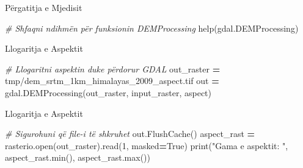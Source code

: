\documentclass[
  ignorenonframetext,
]{beamer}
\newenvironment{Shaded}{\begin{snugshade}}{\end{snugshade}}
\newcommand{\BuiltInTok}[1]{#1}
\newcommand{\CommentTok}[1]{\textcolor[rgb]{0.56,0.35,0.01}{\textit{#1}}}
\newcommand{\DecValTok}[1]{\textcolor[rgb]{0.00,0.00,0.81}{#1}}
\newcommand{\NormalTok}[1]{#1}
\newcommand{\OperatorTok}[1]{\textcolor[rgb]{0.81,0.36,0.00}{\textbf{#1}}}
\newcommand{\StringTok}[1]{\textcolor[rgb]{0.31,0.60,0.02}{#1}}
\newcommand{\VariableTok}[1]{\textcolor[rgb]{0.00,0.00,0.00}{#1}}
\begin{document}
\begin{frame}[fragile]{Përgatitja e Mjedisit}
\protect\hypertarget{puxebrgatitja-e-mjedisit-1}{}

\begin{Shaded}
\begin{Highlighting}[]
\CommentTok{\# Shfaqni ndihmën për funksionin DEMProcessing}
\BuiltInTok{help}\NormalTok{(gdal.DEMProcessing)}
\end{Highlighting}
\end{Shaded}
\end{frame}

\begin{frame}[fragile]{Llogaritja e Aspektit}
\protect\hypertarget{llogaritja-e-aspektit}{}

\begin{Shaded}
\begin{Highlighting}[]
\CommentTok{\# Llogaritni aspektin duke përdorur GDAL}
\NormalTok{out\_raster }\OperatorTok{=} \StringTok{\textquotesingle{}tmp/dem\_srtm\_1km\_himalayas\_2009\_aspect.tif\textquotesingle{}}
\NormalTok{out }\OperatorTok{=}\NormalTok{ gdal.DEMProcessing(out\_raster, input\_raster, }\StringTok{\textquotesingle{}aspect\textquotesingle{}}\NormalTok{)}
\end{Highlighting}
\end{Shaded}
\end{frame}

\begin{frame}[fragile]{Llogaritja e Aspektit}
\protect\hypertarget{llogaritja-e-aspektit-1}{}

\begin{Shaded}
\begin{Highlighting}[]
\CommentTok{\# Sigurohuni që file{-}i të shkruhet}
\NormalTok{out.FlushCache()}
\NormalTok{aspect\_rast }\OperatorTok{=}\NormalTok{ rasterio.}\BuiltInTok{open}\NormalTok{(out\_raster).read(}\DecValTok{1}\NormalTok{, masked}\OperatorTok{=}\VariableTok{True}\NormalTok{)}
\BuiltInTok{print}\NormalTok{(}\StringTok{"Gama e aspektit: "}\NormalTok{, aspect\_rast.}\BuiltInTok{min}\NormalTok{(), aspect\_rast.}\BuiltInTok{max}\NormalTok{())}
\end{Highlighting}
\end{Shaded}
\end{frame}
\end{document}
